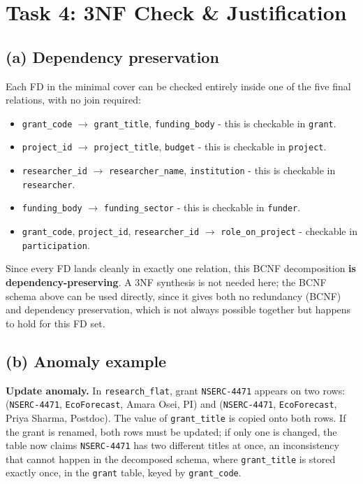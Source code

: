 \documentclass[11pt, letterpaper]{article}
\newcommand{\attr}[1]{\texttt{#1}}
\newcommand{\fd}{\ensuremath{\rightarrow}}
\begin{document}
\section{Task 4: 3NF Check \& Justification}

\subsection*{(a) Dependency preservation}
Each FD in the minimal cover can be checked entirely inside one of the five final relations, with no join required:
\begin{itemize}
  \item \attr{grant\_code} \fd{} \attr{grant\_title}, \attr{funding\_body} - this is checkable in \attr{grant}.
  \item \attr{project\_id} \fd{} \attr{project\_title}, \attr{budget} - this is checkable in \attr{project}.
  \item \attr{researcher\_id} \fd{} \attr{researcher\_name}, \attr{institution} - this is checkable in \attr{researcher}.
  \item \attr{funding\_body} \fd{} \attr{funding\_sector} - this is checkable in \attr{funder}.
  \item \attr{grant\_code}, \attr{project\_id}, \attr{researcher\_id} \fd{} \attr{role\_on\_project} - checkable in \attr{participation}.
\end{itemize}
Since every FD lands cleanly in exactly one relation, this BCNF decomposition \textbf{is dependency-preserving}. A 3NF synthesis is not needed here; the BCNF schema above can be used directly, since it gives both no redundancy (BCNF) and dependency preservation, which is not always possible together but happens to hold for this FD set.

\subsection*{(b) Anomaly example}
\textbf{Update anomaly.} In \attr{research\_flat}, grant \attr{NSERC-4471} appears on two rows: (\attr{NSERC-4471}, \attr{EcoForecast}, Amara Osei, PI) and (\attr{NSERC-4471}, \attr{EcoForecast}, Priya Sharma, Postdoc). The value of \attr{grant\_title} is copied onto both rows. If the grant is renamed, both rows must be updated; if only one is changed, the table now claims \attr{NSERC-4471} has two different titles at once, an inconsistency that cannot happen in the decomposed schema, where \attr{grant\_title} is stored exactly once, in the \attr{grant} table, keyed by \attr{grant\_code}.
\end{document}
